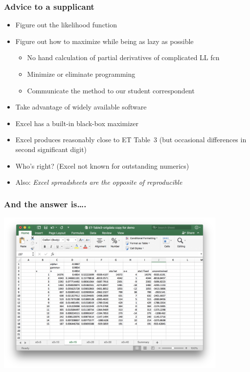 \begin{frame}
    \frametitle{Advice to a supplicant}
	
	\begin{itemize}
		\item Figure out the likelihood function
		\item Figure out how to maximize while being as lazy as possible
		\begin{itemize}
			\item No hand calculation of partial derivatives of complicated LL fcn
			\item Minimize or eliminate programming
			\item Communicate the method to our student correspondent
		\end{itemize}
		\item Take advantage of widely available software
		\bigskip
		\item Excel has a built-in black-box maximizer
		\item Excel produces reasonably close to ET Table~3 (but occasional differences in second significant digit)\pause
		\bigskip
		\item Who's right? (Excel not known for outstanding numerics)
		\item Also: \emph{\color{red} Excel spreadsheets are the opposite of reproducible}
	\end{itemize}
\end{frame}

\begin{frame}
	\frametitle{And the answer is\dots.}
	\begin{center}
		\includegraphics[width=4.5in]{../Manuscripts/Photos/Excel-x0=15.png}
	\end{center}
	
\end{frame}